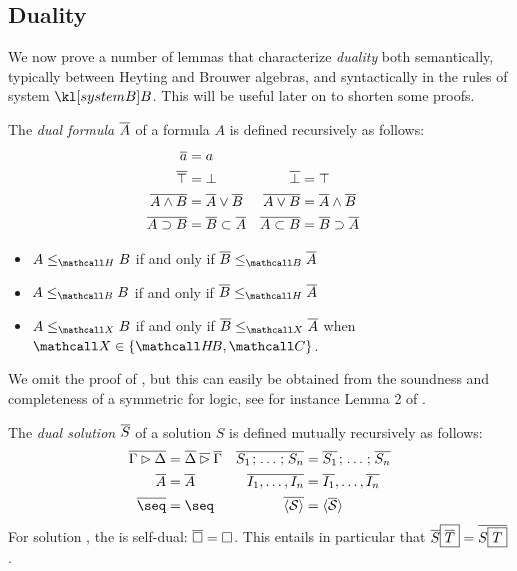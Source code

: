 \subsection{Duality}

We now prove a number of lemmas that characterize \emph{duality} both
semantically, typically between Heyting and Brouwer algebras, and syntactically
in the rules of system $\sysB$. This will be useful later on to shorten some
proofs.

\begin{definition}
  The \emph{dual formula} $\overline{A}$ of a formula $A$ is defined recursively
  as follows:
  \begin{align*}
    \overline{a} &= a &\\
    \overline{\top} &= \bot &
    \overline{\bot} &= \top \\
    \overline{A \land B} &= \overline{A} \lor \overline{B} &
    \overline{A \lor B} &= \overline{A} \land \overline{B} \\
    \overline{A \supset B} &= \overline{B} \subset \overline{A} &
    \overline{A \subset B} &= \overline{B} \supset \overline{A}
  \end{align*}
\end{definition}

\begin{fact}[Duality]
  \sbr
  \begin{itemize}
    \item $A \sementH B$ if and only if $\soldual{B} \sementB \soldual{A}$
    \item $A \sementB B$ if and only if $\soldual{B} \sementH \soldual{A}$
    \item $A \sementX B$ if and only if $\soldual{B} \sementX \soldual{A}$ when $\ACVar
    \in \{\HeytingBrouwer, \Boolean\}$.
  \end{itemize}
\end{fact}

We omit the proof of , but this can easily be obtained from the
soundness and completeness of a symmetric  for 
logic, see for instance Lemma 2 of .

\begin{definition}
  The \emph{dual solution} $\overline{S}$ of a solution $S$ is defined
  mutually recursively as follows:
  \begin{align*}
    \soldual{\Gamma \J \Delta} &= \soldual{\Delta} \mathbin{\soldual{\J}} \soldual{\Gamma} &
    \soldual{S_1 \sep \ldots \sep S_n} &= \soldual{S_1} \sep \ldots \sep \soldual{S_n} \\
    \soldual{A} &= \soldual{A} &
    \soldual{I_1, \ldots, I_n} &= \soldual{I_1}, \ldots, \soldual{I_n} \\
    \soldual{\seq} &= {\seq} &
    \soldual{\piq{\cS}} &= \piq{\soldual{\cS}}
  \end{align*}
  For solution , the  is self-dual: $\overline{\square} = \square$. This
  entails in particular that $\overline{S}\fbox{$\overline{T}$} =
  \overline{S\fbox{$T$}}$.
\end{definition}

